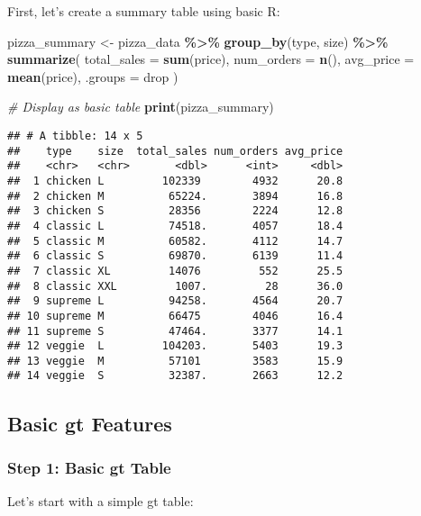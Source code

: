 \documentclass[
]{article}
\newenvironment{Shaded}{\begin{snugshade}}{\end{snugshade}}
\newcommand{\AttributeTok}[1]{\textcolor[rgb]{0.13,0.29,0.53}{#1}}
\newcommand{\CommentTok}[1]{\textcolor[rgb]{0.56,0.35,0.01}{\textit{#1}}}
\newcommand{\FunctionTok}[1]{\textcolor[rgb]{0.13,0.29,0.53}{\textbf{#1}}}
\newcommand{\NormalTok}[1]{#1}
\newcommand{\OtherTok}[1]{\textcolor[rgb]{0.56,0.35,0.01}{#1}}
\newcommand{\SpecialCharTok}[1]{\textcolor[rgb]{0.81,0.36,0.00}{\textbf{#1}}}
\newcommand{\StringTok}[1]{\textcolor[rgb]{0.31,0.60,0.02}{#1}}
\begin{document}
First, let's create a summary table using basic R:

\begin{Shaded}
\begin{Highlighting}[]
\NormalTok{pizza\_summary }\OtherTok{\textless{}{-}}\NormalTok{ pizza\_data }\SpecialCharTok{\%\textgreater{}\%}
  \FunctionTok{group\_by}\NormalTok{(type, size) }\SpecialCharTok{\%\textgreater{}\%}
  \FunctionTok{summarize}\NormalTok{(}
    \AttributeTok{total\_sales =} \FunctionTok{sum}\NormalTok{(price),}
    \AttributeTok{num\_orders =} \FunctionTok{n}\NormalTok{(),}
    \AttributeTok{avg\_price =} \FunctionTok{mean}\NormalTok{(price),}
    \AttributeTok{.groups =} \StringTok{\textquotesingle{}drop\textquotesingle{}}
\NormalTok{  )}

\CommentTok{\# Display as basic table}
\FunctionTok{print}\NormalTok{(pizza\_summary)}
\end{Highlighting}
\end{Shaded}

\begin{verbatim}
## # A tibble: 14 x 5
##    type    size  total_sales num_orders avg_price
##    <chr>   <chr>       <dbl>      <int>     <dbl>
##  1 chicken L         102339        4932      20.8
##  2 chicken M          65224.       3894      16.8
##  3 chicken S          28356        2224      12.8
##  4 classic L          74518.       4057      18.4
##  5 classic M          60582.       4112      14.7
##  6 classic S          69870.       6139      11.4
##  7 classic XL         14076         552      25.5
##  8 classic XXL         1007.         28      36.0
##  9 supreme L          94258.       4564      20.7
## 10 supreme M          66475        4046      16.4
## 11 supreme S          47464.       3377      14.1
## 12 veggie  L         104203.       5403      19.3
## 13 veggie  M          57101        3583      15.9
## 14 veggie  S          32387.       2663      12.2
\end{verbatim}

\subsection{Basic gt Features}\label{basic-gt-features}

\subsubsection{Step 1: Basic gt Table}\label{step-1-basic-gt-table}

Let's start with a simple gt table:
\end{document}
